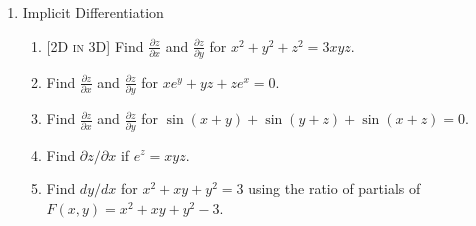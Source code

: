 \documentclass[12pt]{article}
\newcommand{\dimtag}[1]{{\footnotesize\textsc{[#1]}}\;}
\begin{document}
\begin{enumerate}
\item Implicit Differentiation
    \begin{enumerate}
        \item \dimtag{2D in 3D} Find $\frac{\partial z}{\partial x}$ and $\frac{\partial z}{\partial y}$ for $x^2 + y^2 + z^2 = 3xyz$.
        \item Find $\frac{\partial z}{\partial x}$ and $\frac{\partial z}{\partial y}$ for $x e^y + y z + z e^x = 0$.
        \item Find $\frac{\partial z}{\partial x}$ and $\frac{\partial z}{\partial y}$ for $\sin(x+y) + \sin(y+z) + \sin(x+z) = 0$.
        \item Find $\partial z/\partial x$ if $e^{z}=xyz$.
        \item Find $dy/dx$ for $x^2+xy+y^2=3$ using the ratio of partials of $F(x,y)=x^2+xy+y^2-3$.
    \end{enumerate}
\newpage


\end{enumerate}
\end{document}
